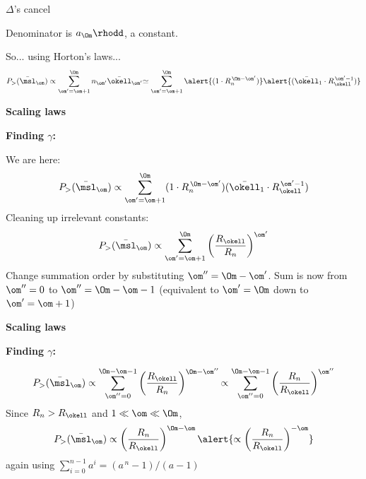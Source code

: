 \begin{frame}[label=]
\begin{frame}[label=]
\begin{frame}[label=]
\begin{frame}[label=]
\begin{frame}[label=]
\begin{frame}[label=]
\begin{frame}[label=]
\begin{frame}[label=]
\begin{frame}[label=]
\begin{frame}[label=]
\begin{frame}[label=]
\begin{frame}[label=]
\begin{frame}[label=]
\begin{frame}[label=]
\begin{frame}[label=]
\begin{frame}[label=]
\begin{frame}[label=]
\begin{frame}[label=]
\begin{frame}[label=]
\begin{frame}[label=]
\begin{frame}[label=]
\begin{frame}[label=]
\begin{frame}[label=]
\begin{frame}[label=]
\begin{frame}[label=]
\begin{frame}[label=]
\begin{frame}[label=]
\begin{frame}[label=]
      $\Delta$'s cancel
     
      Denominator is $a_\Om \rhodd$, a constant.
    
      So...  {using Horton's laws...}
      $$
      P_> (\bar{\msl}_\om)
      \propto
      \sum_{\om'=\om+1}^{\Om} n_{\om'} \bar{\okell}_{\om'}
      {
        \simeq
        \sum_{\om'=\om+1}^{\Om} 
        {\alert{(1\cdot R_n^{\, \Om-\om'})}}
        {\alert{(\bar{\okell}_{1} \cdot R_\okell^{\, \om'-1})}}
      }
      $$
    
  


\begin{frame}[label=]
  \textbf{Scaling laws}

  \textbf{Finding $\gamma$:}
    
     We are here:
      $$
      P_> (\bar{\msl}_\om)
      \propto
      \sum_{\om'=\om+1}^{\Om} 
      (1 \cdot R_n^{\, \Om-\om'})
      (\bar{\okell}_1 \cdot R_\okell^{\, \om'-1})
      $$
     Cleaning up irrelevant constants:
      $$
      P_> (\bar{\msl}_\om)
      \propto
      \sum_{\om'=\om+1}^{\Om} 
      \left(
        \frac{R_\okell}{R_n}
      \right)^{\om'}
      $$
     Change summation order by substituting $\om'' = \Om - \om'$.
     Sum is now from $\om''=0$ to $\om'' = \Om - \om - 1$
      {(equivalent to $\om' = \Om$ down to $\om' = \om + 1$)}
    
  


\begin{frame}[label=]
  \textbf{Scaling laws}

  \textbf{Finding $\gamma$:}
    
    
      $$
      P_> (\bar{\msl}_\om)
      \propto
      \sum_{\om''=0}^{\Om-\om-1} 
      \left(
        \frac{R_\okell}{R_n}
      \right)^{\Om-\om''}
      {
        \propto
        \sum_{\om''=0}^{\Om-\om-1} 
        \left(
          \frac{R_n}{R_\okell}
        \right)^{\om''}
        }
      $$
     Since $R_n > R_\okell$ and $1 \ll \om \ll \Om$,
      {
        $$
        P_> (\bar{\msl}_\om)
        \propto
        \left(
          \frac{R_n}{R_\okell}
        \right)^{\Om-\om}
        {
          \alert{
            \propto
            \left(
              \frac{R_n}{R_\okell}
            \right)^{-\om}
          }
        }
        $$
        again using $\sum_{i=0}^{n-1} a^{i} = (a^{\, n}-1)/(a-1)$
      }
    

\end{frame}
\end{frame}
\end{frame}
\end{frame}
\end{frame}
\end{frame}
\end{frame}
\end{frame}
\end{frame}
\end{frame}
\end{frame}
\end{frame}
\end{frame}
\end{frame}
\end{frame}
\end{frame}
\end{frame}
\end{frame}
\end{frame}
\end{frame}
\end{frame}
\end{frame}
\end{frame}
\end{frame}
\end{frame}
\end{frame}
\end{frame}
\end{frame}
\end{frame}
\end{frame}
